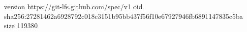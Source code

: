 version https://git-lfs.github.com/spec/v1
oid sha256:27281462a6928792c018c3151b95bb437f56f10e67927946fb6891147835c5ba
size 119380
